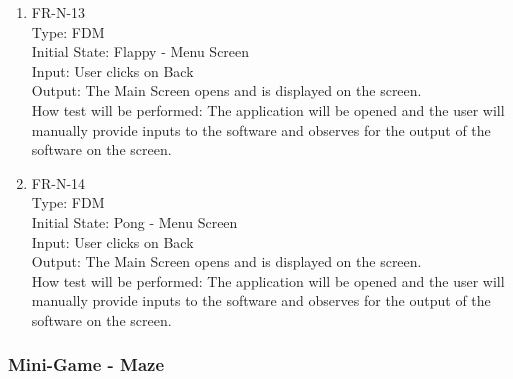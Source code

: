 \documentclass[12pt, titlepage]{article}
\begin{document}
\begin{enumerate}
\item{FR-N-13\\}
Type: FDM\\
Initial State: Flappy - Menu Screen\\
Input: User clicks on Back\\
Output: The Main Screen opens and is displayed on the screen.\\
How test will be performed: The application will be opened and the user will manually provide inputs to the software and observes for the output of the software on the screen.\\

\item{FR-N-14\\}
Type: FDM\\
Initial State: Pong - Menu Screen\\
Input: User clicks on Back\\
Output: The Main Screen opens and is displayed on the screen.\\
How test will be performed: The application will be opened and the user will manually provide inputs to the software and observes for the output of the software on the screen.\\

\end{enumerate}

\subsubsection{Mini-Game - Maze}
\end{document}
